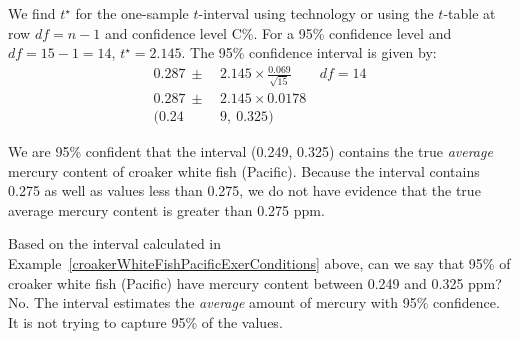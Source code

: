 \begin{examplewrap}
\begin{nexample}
\begin{description}
We find $t^{\star}$ for the one-sample $t$-interval using technology or using the $t$-table at row $df = n -1$ and confidence level C\%.  For a 95\% confidence level and $df = 15 - 1 = 14$, $t^{\star} = 2.145$. The 95\% confidence interval is given by:
\begin{align*}
0.287 \ \pm\  &2.145\times  \frac{0.069}{\sqrt{15}}  \qquad df = 14\\
0.287 \ \pm\  &2.145\times 0.0178 \\
(0.24&9,\ 0.325)
\end{align*}
\item[\inferencestep{Conclude}]  We are 95\% confident that the interval (0.249, 0.325) contains the true \emph{average} mercury content of croaker white fish (Pacific).  Because the interval contains 0.275 as well as values less than 0.275, we do not have evidence that the true average mercury content is  greater than 0.275 ppm.
\end{description}
\end{nexample}
\end{examplewrap}


\begin{examplewrap}
\begin{nexample}
{Based on the interval calculated in Example~\ref{croakerWhiteFishPacificExerConditions} above, can we say that 95\% of croaker white fish (Pacific) have mercury content between 0.249 and 0.325 ppm?}
No.  The interval estimates the \emph{average} amount of mercury with 95\% confidence.  It is not trying to capture 95\% of the values.  
\end{nexample}
\end{examplewrap}


